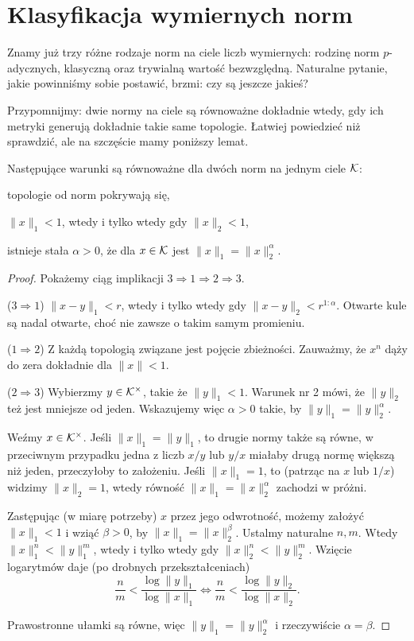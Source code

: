 \section{Klasyfikacja wymiernych norm}
Znamy  już trzy różne rodzaje norm na ciele liczb wymiernych: rodzinę norm $p$-adycznych, klasyczną oraz trywialną wartość bezwzględną.
Naturalne pytanie, jakie powinniśmy sobie postawić, brzmi: czy są jeszcze jakieś?

Przypomnijmy: dwie normy na ciele są równoważne dokładnie wtedy, gdy ich metryki generują dokładnie takie same topologie.
Łatwiej powiedzieć niż sprawdzić, ale na szczęście mamy poniższy lemat.

\begin{lemat}
	Następujące warunki są równoważne dla dwóch norm na jednym ciele $\mathcal K$:
	\begin{enumx}
		\item topologie od norm pokrywają się, 
		\item $\|x\|_1 < 1$, wtedy i tylko wtedy gdy $\|x\|_2 < 1$, 
		\item istnieje stała $\alpha > 0$, że dla $x \in \mathcal K$ jest $\|x\|_1 = \|x\|_2^\alpha$.
	\end{enumx}
\end{lemat}

\begin{proof}
	Pokażemy ciąg implikacji $3 \Rightarrow 1 \Rightarrow 2 \Rightarrow 3$.
	
	($3 \Rightarrow 1$) $\|x-y\|_1 < r$, wtedy i tylko wtedy gdy $\|x-y\|_2 < r^{1:\alpha}$.
	Otwarte kule są nadal otwarte, choć nie zawsze o takim samym promieniu. 

	($1 \Rightarrow 2$) Z każdą topologią związane jest pojęcie zbieżności.
	Zauważmy, że $x^n$ dąży do zera dokładnie dla $\|x\| < 1$.
	
	($2 \Rightarrow 3$) Wybierzmy $y \in \mathcal K^\times$, takie że $\|y\|_1 < 1$.
	Warunek nr 2 mówi, że $\|y\|_2$ też jest mniejsze od jeden.
	Wskazujemy więc $\alpha > 0$ takie, by $\|y\|_1 = \|y\|_2^\alpha$.

	Weźmy $x \in \mathcal K^\times$.
	Jeśli $\|x\|_1 = \|y\|_1$, to drugie normy także są równe, w przeciwnym przypadku jedna z liczb $x/y$ lub $y/x$ miałaby drugą normę większą niż jeden, przeczyłoby to założeniu.
	Jeśli $\|x\|_1 = 1$, to (patrząc na $x$ lub $1/x$) widzimy $\|x\|_2 = 1$, wtedy równość $\|x\|_1 = \|x\|_2^\alpha$ zachodzi w próżni.

	Zastępując (w miarę potrzeby) $x$ przez jego odwrotność, możemy założyć $\|x\|_1 < 1$ i wziąć $\beta > 0$, by $\|x\|_1 = \|x\|_2^\beta$.
	Ustalmy naturalne $n, m$.
	Wtedy $\|x\|_1^n < \|y\|_1^m$, wtedy i tylko wtedy gdy $\|x\|_2^n < \|y\|_2^m$.
	Wzięcie logarytmów daje (po drobnych przekształceniach)
	\[
		\frac nm < \frac{\log \|y\|_1}{\log \|x\|_1} \iff \frac n m < \frac{\log \|y\|_2}{\log \|x\|_2}.
	\]

	Prawostronne ułamki są równe, więc $\|y\|_1 = \|y\|_2^\alpha$ i rzeczywiście $\alpha = \beta$.
\end{proof}

